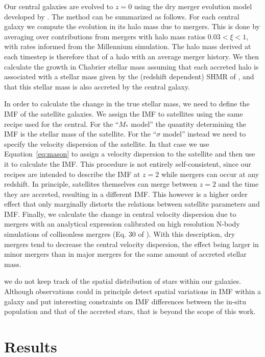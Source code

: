 \documentclass[usenatbib, letters]{mnras}
\def\Eref#1{Equation~\ref{#1}\xspace}
\begin{document}
Our central galaxies are evolved to $z=0$ using the dry merger evolution model developed by \citet{Nip++12}.
The method can be summarized as follows.
For each central galaxy we compute the evolution in its halo mass due to mergers.
This is done by averaging over contributions from mergers with halo mass ratios $0.03 < \xi < 1$, with rates informed from the Millennium simulation.
The halo mass derived at each timestep is therefore that of a halo with an average merger history.
We then calculate the growth in Chabrier stellar mass assuming that each accreted halo is associated with a stellar mass given by the (redshift dependent) SHMR of \citet{Lea++12}, and that this stellar mass is also accreted by the central galaxy.

In order to calculate the change in the true stellar mass, we need to define the IMF of the satellite galaxies. We assign the IMF to satellites using the same recipe used for the central. For the ``$M_*$ model'' the quantity determining the IMF is the stellar mass of the satellite. For the ``$\sigma$ model'' instead we need to specify the velocity dispersion of the satellite. In that case we use \Eref{eq:mason} to assign a velocity dispersion to the satellite and then use it to calculate the IMF.
This procedure is not entirely self-consistent, since our recipes are intended to describe the IMF at $z=2$ while mergers can occur at any redshift. In principle, satellites themselves can merge between $z=2$ and the time they are accreted, resulting in a different IMF. This however is a higher order effect that only marginally distorts the relations between satellite parameters and IMF. 
Finally, we calculate the change in central velocity dispersion due to mergers with an analytical expression calibrated on high resolution N-body simulations of collisonless mergres (Eq. 30 of \citet{Nip++12}). 
With this description, dry mergers tend to decrease the central velocity dispersion, the effect being larger in minor mergers than in major mergers for the same amount of accreted stellar mass.

we do not keep track of the spatial distribution of stars within our galaxies. Although observations could in principle detect spatial variations in IMF within a galaxy and put interesting constraints on IMF differences between the in-situ population and that of the accreted stars, that is beyond the scope of this work.

\section{Results}\label{sect:results}
\end{document}

